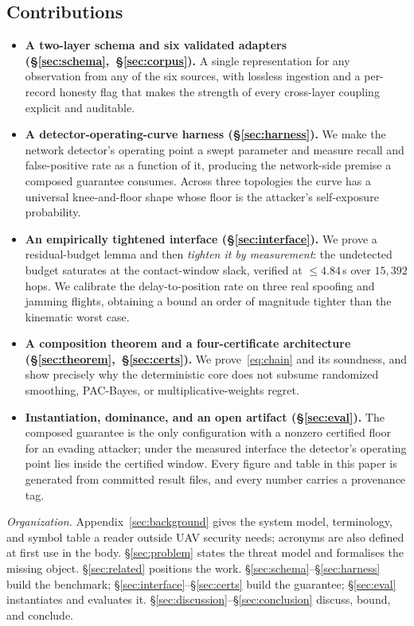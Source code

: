 \subsection*{Contributions}
\begin{itemize}
\item \textbf{A two-layer schema and six validated adapters
(\S\ref{sec:schema},~\S\ref{sec:corpus}).} A single representation for any
observation from any of the six sources, with lossless ingestion and a
per-record honesty flag that makes the strength of every cross-layer coupling
explicit and auditable.

\item \textbf{A detector-operating-curve harness (\S\ref{sec:harness}).} We make
the network detector's operating point a swept parameter and measure recall and
false-positive rate as a function of it, producing the network-side premise a
composed guarantee consumes. Across three topologies the curve has a universal
knee-and-floor shape whose floor is the attacker's self-exposure probability.

\item \textbf{An empirically tightened interface (\S\ref{sec:interface}).} We
prove a residual-budget lemma and then \emph{tighten it by measurement}: the
undetected budget saturates at the contact-window slack, verified at
$\le 4.84$\,s over $15{,}392$ hops. We calibrate the delay-to-position rate on
three real spoofing and jamming flights, obtaining a bound an order of magnitude
tighter than the kinematic worst case.

\item \textbf{A composition theorem and a four-certificate architecture
(\S\ref{sec:theorem},~\S\ref{sec:certs}).} We prove~\eqref{eq:chain} and its
soundness, and show precisely why the deterministic core does not subsume
randomized smoothing, PAC-Bayes, or multiplicative-weights regret.

\item \textbf{Instantiation, dominance, and an open artifact
(\S\ref{sec:eval}).} The composed guarantee is the only configuration with a
nonzero certified floor for an evading attacker; under the measured interface
the detector's operating point lies inside the certified window. Every figure
and table in this paper is generated from committed result files, and every
number carries a provenance tag.
\end{itemize}

\emph{Organization.} Appendix~\ref{sec:background} gives the system model,
terminology, and symbol table a reader outside UAV security needs; acronyms are
also defined at first use in the body.
\S\ref{sec:problem} states the threat model and formalises the missing object.
\S\ref{sec:related} positions the work. \S\ref{sec:schema}--\S\ref{sec:harness}
build the benchmark; \S\ref{sec:interface}--\S\ref{sec:certs} build the
guarantee; \S\ref{sec:eval} instantiates and evaluates it.
\S\ref{sec:discussion}--\S\ref{sec:conclusion} discuss, bound, and conclude.


